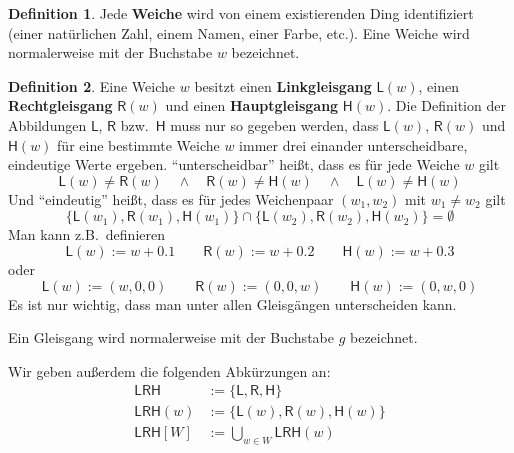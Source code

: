 \documentclass{article}
\theoremstyle{definition}
\newtheorem{defi}{Definition}
\newcommand{\lgang}{\mathsf{L}}
\newcommand{\rgang}{\mathsf{R}}
\newcommand{\hgang}{\mathsf{H}}
\newcommand{\lrh}{\mathsf{LRH}}
\begin{document}
    \begin{defi}
	Jede \textbf{Weiche} wird von einem existierenden Ding identifiziert (einer natürlichen Zahl, einem Namen, einer Farbe, etc.). Eine Weiche wird normalerweise mit der Buchstabe $w$ bezeichnet.
    \end{defi}

    \begin{defi}
	Eine Weiche $w$ besitzt einen \textbf{Linkgleisgang} $\lgang(w)$, einen \textbf{Rechtgleisgang} $\rgang(w)$ und einen \textbf{Hauptgleisgang} $\hgang(w)$. Die Definition der Abbildungen $\lgang$, $\rgang$ bzw.\ $\hgang$ muss nur so gegeben werden, dass $\lgang(w)$, $\rgang(w)$ und $\hgang(w)$ für eine bestimmte Weiche $w$ immer drei einander unterscheidbare, eindeutige Werte ergeben. ``unterscheidbar'' heißt, dass es für jede Weiche $w$ gilt
	\[ \lgang(w)\neq\rgang(w) \quad\land\quad \rgang(w)\neq\hgang(w) \quad\land\quad \lgang(w)\neq\hgang(w) \]
	Und ``eindeutig'' heißt, dass es für jedes Weichenpaar $(w_1, w_2)$ mit $w_1\neq w_2$ gilt
	\[ \{\lgang(w_1), \rgang(w_1), \hgang(w_1)\}\cap\{\lgang(w_2), \rgang(w_2), \hgang(w_2)\} = \emptyset \]
	Man kann z.B.\ definieren
	\[ \lgang(w) := w + 0.1 \qquad \rgang(w) := w + 0.2 \qquad \hgang(w) := w + 0.3 \]
	oder \[ \lgang(w) := (w,0,0) \qquad \rgang(w) := (0,0,w) \qquad \hgang(w) := (0,w,0) \]
	Es ist nur wichtig, dass man unter allen Gleisgängen unterscheiden kann.

	Ein Gleisgang wird normalerweise mit der Buchstabe $g$ bezeichnet.

	Wir geben außerdem die folgenden Abkürzungen an:
	\begin{align*}
	    \lrh &:= \{\lgang,\rgang,\hgang\} \\
	    \lrh(w) &:= \{\lgang(w),\rgang(w),\hgang(w)\} \\
	    \lrh[W] &:= \bigcup_{w\in W}\lrh(w)
	\end{align*}
    \end{defi}
\end{document}
